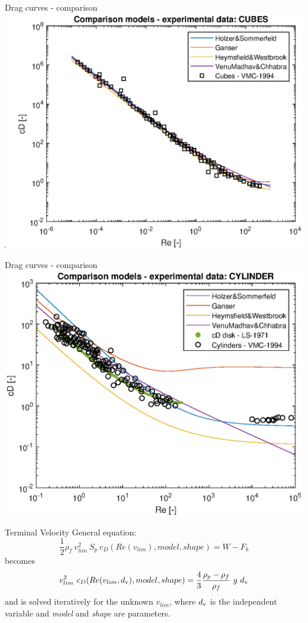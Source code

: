 \documentclass[11pt]{beamer}
\begin{document}
	\begin{frame}{Drag curves - comparison}
		\centering
		\includegraphics[height=\textheight,width=\textwidth,keepaspectratio] {cube_cD.eps}		
	\end{frame}

	\begin{frame}{Drag curves - comparison}
		\centering
		\includegraphics[height=\textheight,width=\textwidth,keepaspectratio] {cylinder_cD.eps}		
	\end{frame}

	\begin{frame}{Terminal Velocity}
		General equation:
		\begin{equation*}
			\frac{1}{2} \rho_{f}\ v_{lim}^2\ S_p\ c_D(Re(v_{lim}), model, shape) = W - F_b
		\end{equation*}
		becomes
		\begin{equation*}
			v_{lim}^2\ c_D(Re(v_{lim}, d_{\textup{v}}), model, shape) = \frac{4}{3} \dfrac{\rho_{p} - \rho_{f}}{\rho_{f}}\ g \ d_{\textup{v}}
		\end{equation*}
		and is solved iteratively for the unknown $ v_{lim} $, where $ d_{\textup{v}} $ is the independent variable and \textit{model} and \textit{shape} are parameters.
	\end{frame}
\end{document}
